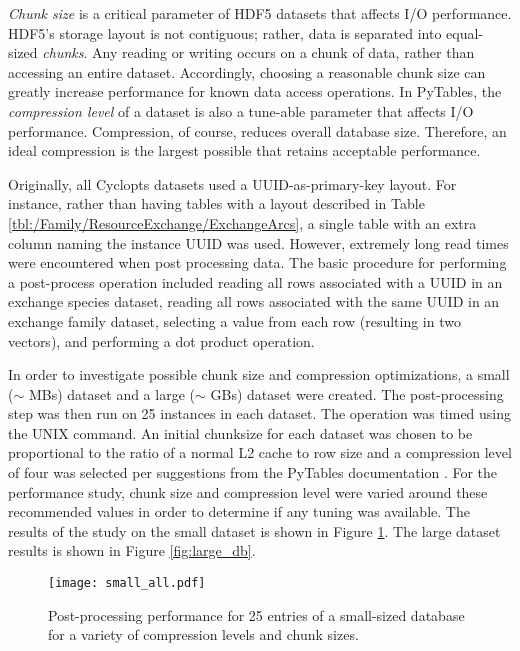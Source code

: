\textit{Chunk size} is a critical parameter of HDF5 datasets that affects I/O
performance. HDF5's storage layout is not contiguous; rather, data is separated
into equal-sized \textit{chunks}. Any reading or writing occurs on a chunk of
data, rather than accessing an entire dataset. Accordingly, choosing a reasonable
chunk size can greatly increase performance for known data access operations. In
PyTables, the \textit{compression level} of a dataset is also a tune-able
parameter that affects I/O performance. Compression, of course, reduces overall
database size. Therefore, an ideal compression is the largest possible that
retains acceptable performance.

Originally, all Cyclopts datasets used a UUID-as-primary-key layout. For
instance, rather than having tables with a layout described in Table
\ref{tbl:/Family/ResourceExchange/ExchangeArcs}, a single table with an extra
column naming the instance UUID was used. However, extremely long read times
were encountered when post processing data. The basic procedure for performing a
post-process operation included reading all rows associated with a UUID in an
exchange species dataset, reading all rows associated with the same UUID in an
exchange family dataset, selecting a value from each row (resulting in two
vectors), and performing a dot product operation.

In order to investigate possible chunk size and compression optimizations, a
small ($\sim$ MBs) dataset and a large ($\sim$ GBs) dataset were created. The
post-processing step was then run on 25 instances in each dataset. The operation
was timed using the UNIX  command. An initial chunksize for each
dataset was chosen to be proportional to the ratio of a normal L2 cache to row
size and a compression level of four was selected per suggestions from the
PyTables documentation \cite{tablesopt}. For the performance study, chunk size
and compression level were varied around these recommended values in order to
determine if any tuning was available. The results of the study on the small
dataset is shown in Figure \ref{fig:small_db}. The large dataset results is
shown in Figure \ref{fig:large_db}.

\begin{figure}
  \begin{center}
    \texttt{[image: small\_all.pdf]}
    \caption{
      \label{fig:small_db}
      Post-processing performance for 25 entries of a small-sized database for a 
      variety of compression levels and chunk sizes.}
  \end{center}
\end{figure}

